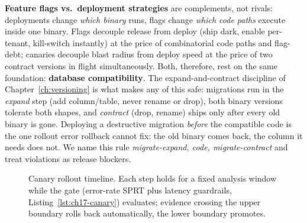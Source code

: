 \textbf{Feature flags vs.\ deployment strategies} are complements, not
rivals: deployments change \emph{which binary} runs, flags change
\emph{which code paths} execute inside one binary. Flags decouple release
from deploy (ship dark, enable per-tenant, kill-switch instantly) at the
price of combinatorial code paths and flag-debt; canaries decouple blast
radius from deploy speed at the price of two contract versions in flight
simultaneously. Both, therefore, rest on the same foundation:
\textbf{database compatibility}. The expand-and-contract discipline of
Chapter~\ref{ch:versioning} is what makes any of this safe: migrations
run in the \emph{expand} step (add column/table, never rename or drop),
both binary versions tolerate both shapes, and \emph{contract} (drop,
rename) ships only after every old binary is gone. Deploying a
destructive migration \emph{before} the compatible code is the one
rollout error rollback cannot fix: the old binary comes back, the column
it needs does not. We name this rule \emph{migrate-expand, code,
migrate-contract} and treat violations as release blockers.

\begin{figure}[h]
\centering
{}
\caption{Canary rollout timeline. Each step holds for a fixed analysis
window while the gate (error-rate SPRT plus latency guardrails,
Listing~\ref{lst:ch17-canary}) evaluates; evidence crossing the upper
boundary rolls back automatically, the lower boundary promotes.}
\label{fig:ch17-canary}
\end{figure}

